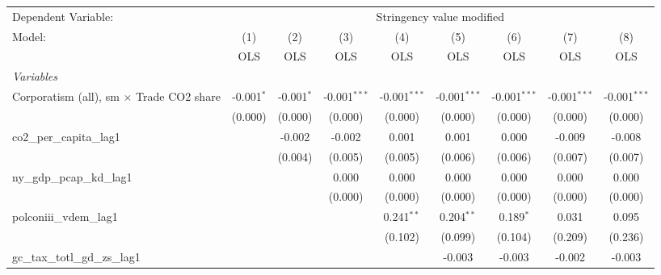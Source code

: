
\begingroup
\centering
\begin{tabular}{lcccccccc}
   \toprule
   Dependent Variable: & \multicolumn{8}{c}{Stringency value modified}\\
   Model:                                          & (1)          & (2)          & (3)            & (4)            & (5)            & (6)            & (7)            & (8)\\  
                                                   &  OLS         & OLS          & OLS            & OLS            & OLS            & OLS            & OLS            & OLS\\  
   \midrule
   \emph{Variables}\\
   Corporatism (all), sm $\times$ Trade CO2 share  & -0.001$^{*}$ & -0.001$^{*}$ & -0.001$^{***}$ & -0.001$^{***}$ & -0.001$^{***}$ & -0.001$^{***}$ & -0.001$^{***}$ & -0.001$^{***}$\\   
                                                   & (0.000)      & (0.000)      & (0.000)        & (0.000)        & (0.000)        & (0.000)        & (0.000)        & (0.000)\\   
   co2\_per\_capita\_lag1                          &              & -0.002       & -0.002         & 0.001          & 0.001          & 0.000          & -0.009         & -0.008\\   
                                                   &              & (0.004)      & (0.005)        & (0.005)        & (0.006)        & (0.006)        & (0.007)        & (0.007)\\   
   ny\_gdp\_pcap\_kd\_lag1                         &              &              & 0.000          & 0.000          & 0.000          & 0.000          & 0.000          & 0.000\\   
                                                   &              &              & (0.000)        & (0.000)        & (0.000)        & (0.000)        & (0.000)        & (0.000)\\   
   polconiii\_vdem\_lag1                           &              &              &                & 0.241$^{**}$   & 0.204$^{**}$   & 0.189$^{*}$    & 0.031          & 0.095\\   
                                                   &              &              &                & (0.102)        & (0.099)        & (0.104)        & (0.209)        & (0.236)\\   
   gc\_tax\_totl\_gd\_zs\_lag1                     &              &              &                &                & -0.003         & -0.003         & -0.002         & -0.003\\   

\end{tabular}

